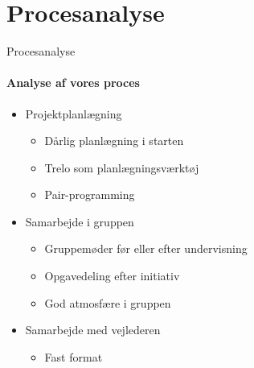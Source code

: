 \section{Procesanalyse}
\begin{frame}{Procesanalyse}
	\framesubtitle{Analyse af vores proces}
	
	\begin{itemize}
		\item Projektplanlægning
		\begin{itemize}
			\item Dårlig planlægning i starten
			\item Trelo som planlægningsværktøj
			\item Pair-programming
		\end{itemize}
		\item Samarbejde i gruppen
		\begin{itemize}
			\item Gruppemøder før eller efter undervisning
			\item Opgavedeling efter initiativ
			\item God atmosfære i gruppen
		\end{itemize}
		\item Samarbejde med vejlederen
		\begin{itemize}
			\item Fast format
		\end{itemize}
	\end{itemize}

\end{frame}

